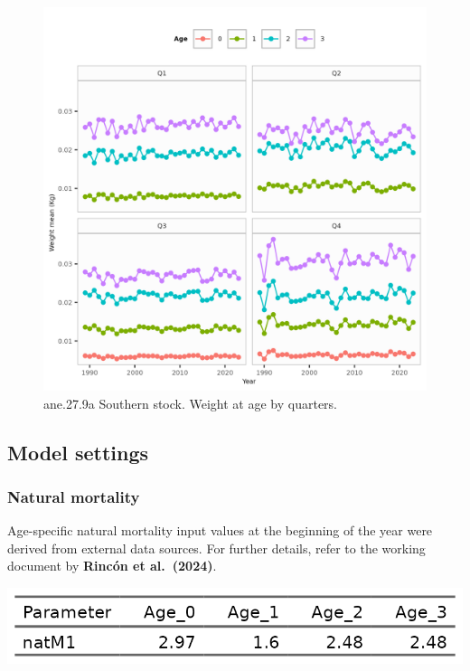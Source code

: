 \documentclass[
]{article}
\begin{document}
\begin{figure}[H]

{\centering \includegraphics[width=0.95\linewidth]{report/run/S1.0_4FLEETS_SelECO_RecIndex_Mnewfix/fig_weight_by_quarters} 

}

\caption{ane.27.9a Southern stock. Weight at age by quarters.}\label{fig:unnamed-chunk-9}
\end{figure}

\hypertarget{model-settings}{%
\subsection{Model settings}\label{model-settings}}

\hypertarget{natural-mortality}{%
\subsubsection{Natural mortality}\label{natural-mortality}}

Age-specific natural mortality input values at the beginning of the year
were derived from external data sources. For further details, refer to
the working document by \textbf{Rincón et al.~(2024)}.

\begin{center}\includegraphics[width=0.95\linewidth]{report/run/S1.0_4FLEETS_SelECO_RecIndex_Mnewfix/tb_natM} \end{center}
\end{document}
